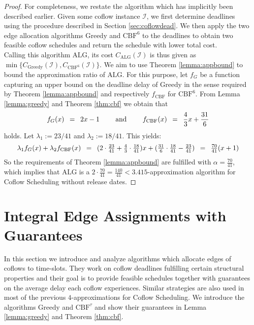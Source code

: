 \documentclass[11pt]{article}
\newcommand{\Hquad}{\hspace{0.5em}}
\begin{document}
\rsthmcoflowapprox*

\begin{proof}
For completeness, we restate the algorithm which has implicitly been described earlier. Given some coflow instance $\mathcal{I}$, we first determine deadlines using the procedure described in Section \ref{sec:coflowdead}. We then apply the two edge allocation algorithms $\mathrm{Greedy}$ and $\mathrm{CBF}^6$ to the deadlines to obtain two feasible coflow schedules and return the schedule with lower total cost.\\

Calling this algorithm $\mathrm{ALG}$, its cost $C_{\mathrm{ALG}}(\mathcal{I})$ is thus given as $\min\{C_{\mathrm{Greedy}}(\mathcal{I}), C_{\mathrm{CBF}^6}(\mathcal{I})\}$. We aim to use Theorem \ref{lemma:appbound} to bound the approximation ratio of $\mathrm{ALG}$. For this purpose, let $f_G$ be a function capturing an upper bound on the deadline delay of $\mathrm{Greedy}$ in the sense required by Theorem \ref{lemma:appbound} and respectively $f_{\mathrm{CBF}}$ for $\mathrm{CBF}^6$. From Lemma \ref{lemma:greedy} and Theorem \ref{thm:cbf} we obtain that
\begin{equation*}
    f_G(x) \Hquad=\Hquad  2x-1 \qquad \text{ and } \qquad f_{\mathrm{CBF}}(x) \Hquad=\Hquad \frac{4}{3}x + \frac{31}{6}   
\end{equation*}
holds. Let $\lambda_1 := 23/41$ and $\lambda_2 := 18/41$. This yields:
\begin{equation*}
    \lambda_1 f_G(x) + \lambda_2f_{\mathrm{CBF}}(x) \Hquad=\Hquad (2 \cdot \tfrac{23}{41} + \tfrac{4}{3}\cdot \tfrac{18}{41})x + (\tfrac{31}{6} \cdot \tfrac{18}{41} - \tfrac{23}{41}) \Hquad=\Hquad \tfrac{70}{41}(x+1)
\end{equation*}
So the requirements of Theorem \ref{lemma:appbound} are fulfilled with $\alpha = \tfrac{70}{41}$, which implies that $\mathrm{ALG}$ is a $2 \cdot \tfrac{70}{41} = \tfrac{140}{41} < 3.415$-approximation algorithm for Coflow Scheduling without release dates.
\end{proof}



\section{Integral Edge Assignments with Guarantees}\label{sec:schedflows}

In this section we introduce and analyze algorithms which allocate edges of coflows to time-slots. They work on coflow deadlines fulfilling certain structural properties and their goal is to provide feasible schedules together with guarantees on the average delay each coflow experiences. Similar strategies are also used in most of the previous $4$-approximations for Coflow Scheduling. We introduce the algorithms $\mathrm{Greedy}$ and $\mathrm{CBF}^\tau$ and show their guarantees in Lemma \ref{lemma:greedy} and Theorem \ref{thm:cbf}.
\end{document}
